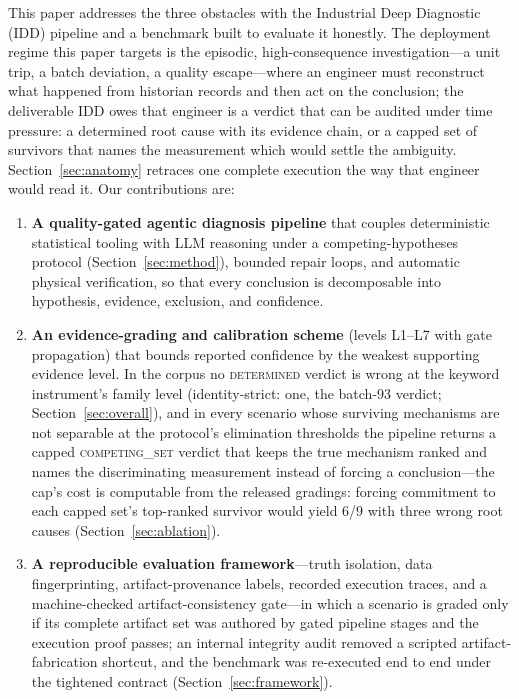 \documentclass[preprint,12pt]{elsarticle}
\begin{document}
This paper addresses the three obstacles with the Industrial Deep Diagnostic (IDD) pipeline and a benchmark built to evaluate it honestly. The deployment regime this paper targets is the episodic, high-consequence investigation---a unit trip, a batch deviation, a quality escape---where an engineer must reconstruct what happened from historian records and then act on the conclusion; the deliverable IDD owes that engineer is a verdict that can be audited under time pressure: a determined root cause with its evidence chain, or a capped set of survivors that names the measurement which would settle the ambiguity. Section~\ref{sec:anatomy} retraces one complete execution the way that engineer would read it. Our contributions are:

\begin{enumerate}
\item \textbf{A quality-gated agentic diagnosis pipeline} that couples deterministic statistical tooling with LLM reasoning under a competing-hypotheses protocol (Section~\ref{sec:method}), bounded repair loops, and automatic physical verification, so that every conclusion is decomposable into hypothesis, evidence, exclusion, and confidence.
\item \textbf{An evidence-grading and calibration scheme} (levels L1--L7 with gate propagation) that bounds reported confidence by the weakest supporting evidence level. In the corpus no \mbox{\textsc{determined}} verdict is wrong at the keyword instrument's family level (identity-strict: one, the batch-93 verdict; Section~\ref{sec:overall}), and in every scenario whose surviving mechanisms are not separable at the protocol's elimination thresholds the pipeline returns a capped \mbox{\textsc{competing\_set}} verdict that keeps the true mechanism ranked and names the discriminating measurement instead of forcing a conclusion---the cap's cost is computable from the released gradings: forcing commitment to each capped set's top-ranked survivor would yield 6/9 with three wrong root causes (Section~\ref{sec:ablation}).
\item \textbf{A reproducible evaluation framework}---truth isolation, data fingerprinting, artifact-provenance labels, recorded execution traces, and a machine-checked artifact-consistency gate---in which a scenario is graded only if its complete artifact set was authored by gated pipeline stages and the execution proof passes; an internal integrity audit removed a scripted artifact-fabrication shortcut, and the benchmark was re-executed end to end under the tightened contract (Section~\ref{sec:framework}).

\end{enumerate}
\end{document}
